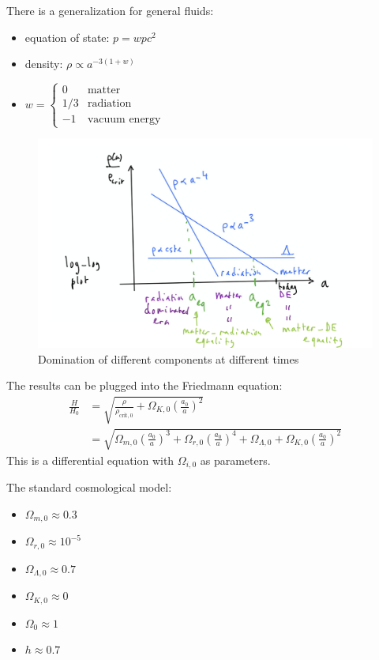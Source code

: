 There is a generalization for general fluids:
\begin{itemize}
	\item equation of state: $p = w p c^2$
	\item density: $\rho \propto a^{-3(1+w)}$
	\item $\displaystyle w = 
	\begin{cases}
	0 & \text{matter}\\
	1/3 & \text{radiation}\\
	-1 & \text{vacuum energy}
	\end{cases}
	$
\end{itemize}

\begin{figure}
	\centering
	\includegraphics[width=\textwidth]{img/ch-02/domination.png}
	\caption{Domination of different components at different times}
	\label{fig:domination}
\end{figure}

The results can be plugged into the Friedmann equation:
\begin{align*}
	\frac{H}{H_0} 
	&= \sqrt{\frac{\rho}{\rho_{\text{crit}, 0}} + \Omega_{K,0} \left( \frac{a_0}{a} \right)^2 }\\
	&= \sqrt{
		\Omega_{m,0} \left( \frac{a_0}{a} \right)^3
		+ \Omega_{r,0} \left( \frac{a_0}{a} \right)^4
		+ \Omega_{\Lambda,0}
		+ \Omega_{K,0} \left( \frac{a_0}{a} \right)^2
	}
\end{align*}
This is a differential equation with $\Omega_{i,0}$ as parameters.

The standard cosmological model:
\begin{itemize}
	\item $\Omega_{m,0} \approx 0.3$
	\item $\Omega_{r,0} \approx 10^{-5}$
	\item $\Omega_{\Lambda,0} \approx 0.7$
	\item $\Omega_{K,0} \approx 0$
	\item $\Omega_0 \approx 1$
	\item $h \approx 0.7$
\end{itemize}


